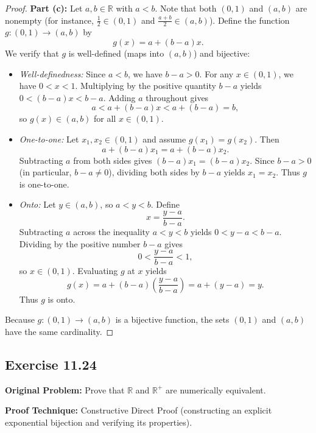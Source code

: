 \documentclass[11pt, letterpaper]{article}
\theoremstyle{definition}
\theoremstyle{remark}
\begin{document}
\begin{proof}
\textbf{Part (c):}
Let $a, b \in \mathbb{R}$ with $a < b$. Note that both $(0, 1)$ and $(a, b)$ are nonempty (for instance, $\frac{1}{2} \in (0, 1)$ and $\frac{a+b}{2} \in (a, b)$). Define the function $g : (0, 1) \to (a, b)$ by
\[
g(x) = a + (b - a)x.
\]
We verify that $g$ is well-defined (maps into $(a, b)$) and bijective:
\begin{itemize}
    \item \emph{Well-definedness:} Since $a < b$, we have $b - a > 0$. For any $x \in (0, 1)$, we have $0 < x < 1$. Multiplying by the positive quantity $b - a$ yields $0 < (b - a)x < b - a$. Adding $a$ throughout gives
    \[
    a < a + (b - a)x < a + (b - a) = b,
    \]
    so $g(x) \in (a, b)$ for all $x \in (0, 1)$.
    \item \emph{One-to-one:} Let $x_1, x_2 \in (0, 1)$ and assume $g(x_1) = g(x_2)$. Then
    \[
    a + (b - a)x_1 = a + (b - a)x_2.
    \]
    Subtracting $a$ from both sides gives $(b - a)x_1 = (b - a)x_2$. Since $b - a > 0$ (in particular, $b - a \neq 0$), dividing both sides by $b - a$ yields $x_1 = x_2$. Thus $g$ is one-to-one.
    \item \emph{Onto:} Let $y \in (a, b)$, so $a < y < b$. Define
    \[
    x = \frac{y - a}{b - a}.
    \]
    Subtracting $a$ across the inequality $a < y < b$ yields $0 < y - a < b - a$. Dividing by the positive number $b - a$ gives
    \[
    0 < \frac{y - a}{b - a} < 1,
    \]
    so $x \in (0, 1)$. Evaluating $g$ at $x$ yields
    \[
    g(x) = a + (b - a)\left(\frac{y - a}{b - a}\right) = a + (y - a) = y.
    \]
    Thus $g$ is onto.
\end{itemize}
Because $g : (0, 1) \to (a, b)$ is a bijective function, the sets $(0, 1)$ and $(a, b)$ have the same cardinality.
\end{proof}

\subsection{Exercise 11.24}

\textbf{Original Problem:} Prove that $\mathbb{R}$ and $\mathbb{R}^+$ are numerically equivalent.

\textbf{Proof Technique:} Constructive Direct Proof (constructing an explicit exponential bijection and verifying its properties).
\end{document}

